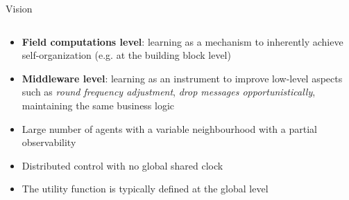 \begin{frame}{\playfairblack Vision}
  \begin{columns}[onlytextwidth, t]
    \begin{column}{\textwidth}
      \begin{card}
        \begin{itemize}
          \item[\highlightAlt{\faStar}] \textbf{Field computations level}: learning as a mechanism to inherently achieve self-organization (e.g. at the building block level)
          \item[\highlightAlt{\faStar}] \textbf{Middleware level}: learning as an instrument to improve low-level aspects such as \emph{round frequency adjustment}, \emph{drop messages opportunistically}, maintaining the same business logic
        \end{itemize}
      \end{card}
      \begin{card}[Settings]
        \begin{itemize}
          \item Large number of agents with a variable neighbourhood with a partial observability
          \item Distributed control with no global shared clock 
          \item The utility function is typically defined at the global level
        \end{itemize}
      \end{card}
    \end{column}
  \end{columns}
\end{frame}